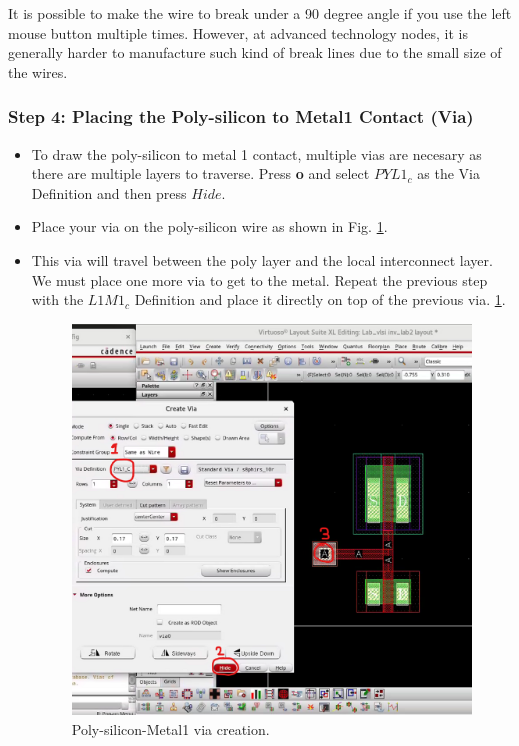 	\begin{remark}
	It is possible to make the wire to break under a 90 degree angle if you use the left mouse button multiple times. However, at advanced technology nodes, it is generally harder to manufacture such kind of break lines due to the small size of the wires.
\end{remark}

\subsubsection*{Step 4: Placing the Poly-silicon to Metal1 Contact (Via)}
\begin{itemize}
	\item To draw the poly-silicon to metal 1 contact, multiple vias are necesary as there are multiple layers to traverse. Press \textbf{o} and select $PYL1_c$ as the Via Definition and then press $Hide$.
	\item Place your via on the poly-silicon wire as shown in Fig. \ref{layout_createvia}.
	\item This via will travel between the poly layer and the local interconnect layer. We must place one more via to get to the metal. Repeat the previous step with the $L1M1_c$ Definition and place it directly on top of the previous via.  \ref{layout_createvia}.
	\begin{figure}[!h]
		\centering
		\includegraphics[scale=0.32]{figures/lab2/3}
		\caption{Poly-silicon-Metal1 via creation.}
		\label{layout_createvia}
	\end{figure}
	
\end{itemize}


